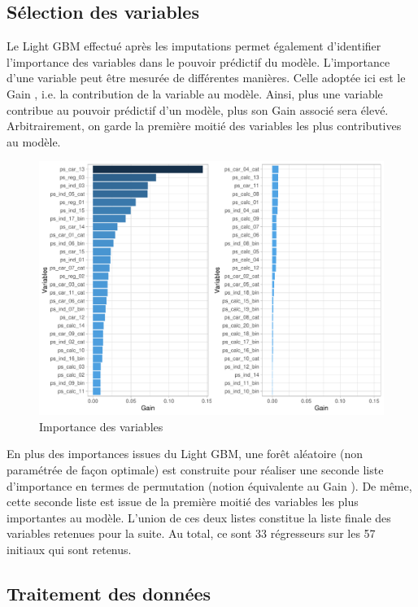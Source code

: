 \documentclass[french]{article}
\begin{document}
\begin{multicols}{2}
\subsection{Sélection des variables}

Le Light GBM effectué après les imputations permet également d'identifier l'importance des variables dans le pouvoir prédictif du modèle. L'importance d'une variable peut être mesurée de différentes manières. Celle adoptée ici est le \og Gain \fg{}, i.e. la contribution de la variable au modèle. Ainsi, plus une variable contribue au pouvoir prédictif d'un modèle, plus son \og Gain \fg{} associé sera élevé. Arbitrairement, on garde la première moitié des variables les plus contributives au modèle.

\begin{figure}[H] \centering
  \includegraphics[width = \columnwidth]{img/var_imp_lgb}
  \caption{Importance des variables}
\end{figure}


En plus des importances issues du Light GBM, une forêt aléatoire (non paramétrée de façon optimale) est construite pour réaliser une seconde liste d'importance en termes de \og permutation \fg{} (notion équivalente au \og Gain \fg{}). De même, cette seconde liste est issue de la première moitié des variables les plus importantes au modèle. L'union de ces deux listes constitue la liste finale des variables retenues pour la suite. Au total, ce sont 33 régresseurs sur les 57 initiaux qui sont retenus.


\subsection{Traitement des données}


\end{multicols}
\end{document}
